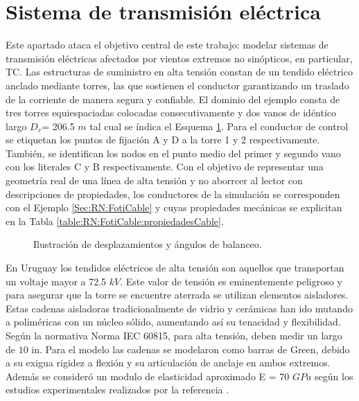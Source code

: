 \section{Sistema de transmisión eléctrica }\label{Sec:RN:TransmissionSystem}
Este apartado ataca el objetivo central de este trabajo: modelar sistemas de transmisión eléctricas afectados por vientos extremos no sinópticos, en particular, TC. Las estructuras de suministro en alta tensión constan de un tendido eléctrico anclado mediante torres, las que sostienen el conductor garantizando un traslado de la corriente de manera segura y confiable. El dominio del ejemplo consta de tres torres equiespaciadas colocadas consecutivamente y dos vanos de idéntico largo $D_v$= 206.5 $m$ tal cual se índica el Esquema \ref{fig:Transmission:EsquemaGeneral}.  Para el conductor de control se etiquetan los puntos de fijación $\text{A}$ y $\text{D}$ a la torre 1 y 2 respectivamente. También, se identifican los nodos en el punto medio del primer y segundo vano con los literales $\text{C}$ y $\text{B}$ respectivamente. Con el objetivo de representar una geometría real de una línea de alta tensión y no aborrcer al lector con descripciones de propiedades, los conductores de la simulación se corresponden con el Ejemplo \ref{Sec:RN:FotiCable} y cuyas propiedades mecánicas se explicitan en la Tabla \ref{table:RN:FotiCable:propiedadesCable}.  


\begin{figure}[htbp]
	\centering
	\def\svgwidth{120mm}
	
	\caption{Ilustración de desplazamientos y ángulos de balanceo.}
	\label{fig:Transmission:EsquemaGeneral}
\end{figure}

 En Uruguay los tendidos eléctricos de alta tensión son aquellos que transportan un voltaje mayor a 72.5 $kV$. Este valor de tensión es eminentemente peligroso y para asegurar que la torre se encuentre aterrada se utilizan elementos aisladores. Estas cadenas aisladoras tradicionalmente de vidrio y cerámicas han ido mutando a poliméricas con un núcleo sólido, aumentando así su tenacidad y flexibilidad. Según la normativa Norma IEC 60815, para alta tensión, deben medir un largo de $10$ in. Para el modelo las cadenas se modelaron como barras de Green, debido a su exigua rigidez a flexión y su articulación de anclaje en ambos extremos. Además se consideró un modulo de elasticidad aproximado E = 70 $GPa$ según los estudios experimentales realizados por la referencia \cite{MoralesAisladores}.


